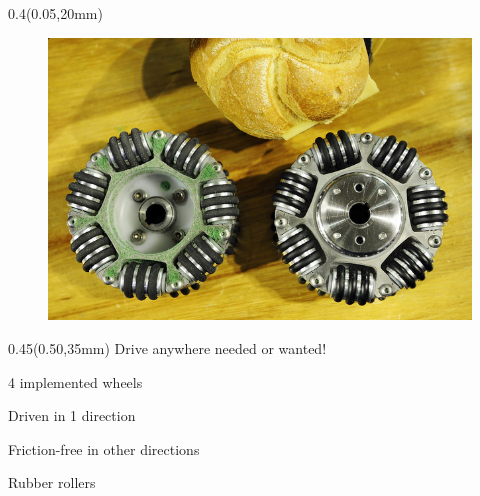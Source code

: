 \documentclass[aspectratio=43]{beamer}
\newcommand{\TULeftMargin}{0.05\paperwidth}
\newcommand{\TULeftWidth}{0.4\paperwidth}
\newcommand{\TURightMargin}{0.50\paperwidth}
\newcommand{\TURightWidth}{0.45\paperwidth}
\begin{document}
\begin{frame}
	\end{frame}	
	
%



	\begin{frame}
	
		\begin{textblock*}{\TULeftWidth}(\TULeftMargin,20mm)
			\begin{figure}
				\centering
				\includegraphics[width=1\linewidth]{[TechUnitedStyle]/Figures/Omniwielen}
			\end{figure}
		\end{textblock*}
		
		\begin{textblock*}{\TURightWidth}(\TURightMargin,35mm)
			 Drive anywhere needed or wanted!
			\begin{TechUnitedItems}
				\item 4 implemented wheels
				\item Driven in 1 direction
				\item Friction-free in other directions
				\item Rubber rollers	
			
			\end{TechUnitedItems}
			
	\end{textblock*}
	
	\end{frame}
	
\end{document}
